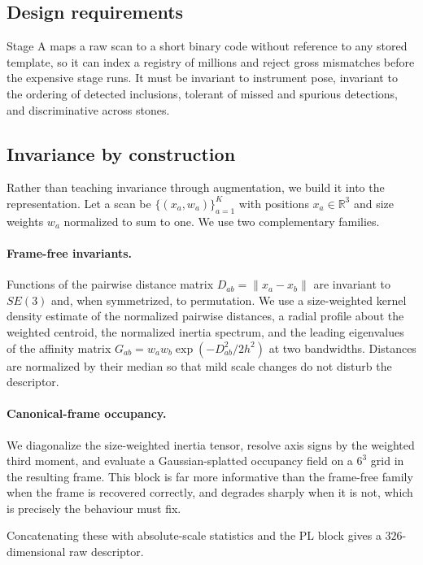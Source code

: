 \documentclass[10pt,twocolumn]{article}
\theoremstyle{remark}
\begin{document}
\subsection{Design requirements}

Stage A maps a raw scan to a short binary code without reference to any stored
template, so it can index a registry of millions and reject gross mismatches
before the expensive stage runs. It must be invariant to instrument pose,
invariant to the ordering of detected inclusions, tolerant of missed and
spurious detections, and discriminative across stones.

\subsection{Invariance by construction}

Rather than teaching invariance through augmentation, we build it into the
representation. Let a scan be $\{(x_a, w_a)\}_{a=1}^{K}$ with positions
$x_a \in \mathbb{R}^3$ and size weights $w_a$ normalized to sum to one. We use
two complementary families.

\paragraph{Frame-free invariants.} Functions of the pairwise distance matrix
$D_{ab}=\lVert x_a - x_b\rVert$ are invariant to $SE(3)$ and, when symmetrized,
to permutation. We use a size-weighted kernel density estimate of the normalized
pairwise distances, a radial profile about the weighted centroid, the normalized
inertia spectrum, and the leading eigenvalues of the affinity matrix
$G_{ab}=w_aw_b\exp(-D_{ab}^2/2h^2)$ at two bandwidths. Distances are normalized
by their median so that mild scale changes do not disturb the descriptor.

\paragraph{Canonical-frame occupancy.} We diagonalize the size-weighted inertia
tensor, resolve axis signs by the weighted third moment, and evaluate a
Gaussian-splatted occupancy field on a $6^3$ grid in the resulting frame. This
block is far more informative than the frame-free family when the frame is
recovered correctly, and degrades sharply when it is not, which is precisely the
behaviour  must fix.

Concatenating these with absolute-scale statistics and the PL block gives a
$326$-dimensional raw descriptor.
\end{document}
